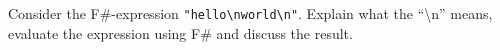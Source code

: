 Consider the F\#-expression \lstinline{"hello\nworld\n"}. Explain what the ``\textbackslash n'' means, evaluate the expression using F\# and discuss the result.